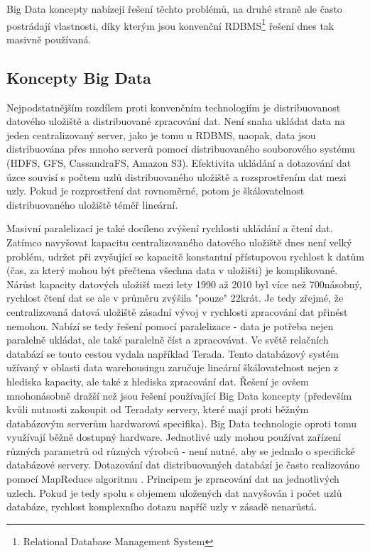 \documentclass[11pt,twoside,a4paper]{book}
\begin{document}
		Big Data koncepty nabízejí řešení těchto problémů, na druhé straně ale často postrádají vlastnosti, díky kterým jsou  konvenční RDBMS\footnote{Relational Database Management System} řešení dnes tak masivně používaná.  

		\subsection{Koncepty Big Data}
	
		Nejpodstatnějším rozdílem proti konvenčním technologiím je distribuovanost datového uložiště a distribuované zpracování dat. \cite{Hellr01} Není snaha ukládat data na jeden centralizovaný server, jako je tomu u RDBMS, naopak, data jsou distribuována přes mnoho serverů pomocí distribuovaného souborového systému (HDFS, GFS, CassandraFS, Amazon S3). Efektivita ukládání a dotazování dat úzce souvisí s počtem uzlů distribuovaného uložiště a rozsprostřením dat mezi uzly. Pokud je rozprostření dat rovnoměrné, potom je škálovatelnost distribuovaného uložiště téměř lineární.
		
		Masivní paralelizací je také docíleno zvýšení rychlosti ukládání a čtení dat. Zatímco navyšovat kapacitu centralizovaného datového uložiště dnes není velký problém, udržet při zvyšující se kapacitě konstantní přístupovou rychlost k datům (čas, za který mohou být přečtena všechna data v uložišti) je komplikované. Nárůst kapacity datových uložišť mezi lety 1990 až 2010 byl více než 700násobný, rychlost čtení dat se ale v průměru zvýšila "pouze" 22krát. \cite{white01} Je tedy zřejmé, že centralizovaná datová uložiště zásadní vývoj v rychlosti zpracování dat přinést nemohou. Nabízí se tedy řešení pomocí paralelizace - data je  potřeba nejen paralelně ukládat, ale také paralelně číst a zpracovávat. Ve světě relačních databází se touto cestou vydala například Terada. Tento databázový systém užívaný v oblasti data warehousingu zaručuje lineární škálovatelnost nejen z hlediska kapacity, ale také z hlediska zpracování dat. Řešení je ovšem mnohonásobně dražší než jsou řešení používající Big Data koncepty (především kvůli nutnosti zakoupit od Teradaty servery, které mají proti běžným databázovým serverům hardwarová specifika). Big Data technologie oproti tomu využívají běžně dostupný hardware. Jednotlivé uzly  mohou používat zařízení různých parametrů od různých výrobců - není nutné, aby se jednalo o specifické databázové servery. Dotazování dat distribuovaných databází je často realizováno pomocí MapReduce algoritmu \cite{MapRed01}. Principem je zpracování dat na jednotlivých uzlech. Pokud je tedy spolu s objemem uložených dat navyšován i počet uzlů databáze, rychlost komplexního dotazu napříč uzly v zásadě nenarůstá.  
\end{document}
